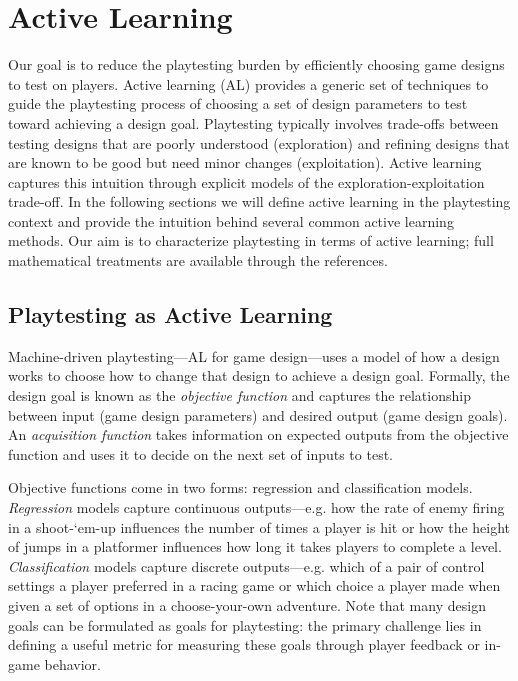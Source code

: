 \documentclass{sig-alternate}
\begin{document}

\section{Active Learning}

Our goal is to reduce the playtesting burden by efficiently choosing game designs to test on players.
Active learning (AL) provides a generic set of techniques to guide the playtesting process of choosing a set of design parameters to test toward achieving a design goal.
Playtesting typically involves trade-offs between testing designs that are poorly understood (exploration) and refining designs that are known to be good but need minor changes (exploitation).
Active learning captures this intuition through explicit models of the exploration-exploitation trade-off.
In the following sections we will define active learning in the playtesting context and provide the intuition behind several common active learning methods.
Our aim is to characterize playtesting in terms of active learning; full mathematical treatments are available through the references.


\subsection{Playtesting as Active Learning}
Machine-driven playtesting---AL for game design---uses a model of how a design works to choose how to change that design to achieve a design goal.
Formally, the design goal is known as the \textit{objective function} and captures the relationship between input (game design parameters) and desired output (game design goals).
An \textit{acquisition function} takes information on expected outputs from the objective function and uses it to decide on the next set of inputs to test.

Objective functions come in two forms: regression and classification models.
\textit{Regression} models capture continuous outputs---e.g. how the rate of enemy firing in a shoot-`em-up influences the number of times a player is hit or how the height of jumps in a platformer influences how long it takes players to complete a level.
\textit{Classification} models capture discrete outputs---e.g. which of a pair of control settings a player preferred in a racing game or which choice a player made when given a set of options in a choose-your-own adventure.
Note that many design goals can be formulated as goals for playtesting: the primary challenge lies in defining a useful metric for measuring these goals through player feedback or in-game behavior.
\end{document}
